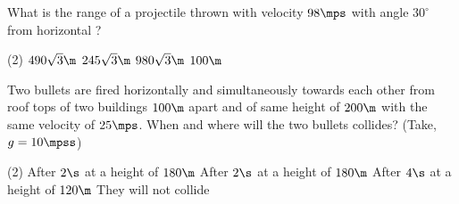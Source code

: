 \item What is the range of a projectile thrown with velocity $98\mps$ with angle $30^\circ$ from horizontal ?
\begin{tasks}(2)
    \task $490\sqrt{3}\m$\ans
    \task $245\sqrt{3}\m$
    \task $980\sqrt{3}\m$
    \task $100\m$
\end{tasks}

\item Two bullets are fired horizontally and simultaneously towards each other from roof tops of two buildings $100\m$ apart and of same height of $200\m$ with the same velocity of $25\mps$. When and where will the two bullets collides? (Take, $g=10\mpss$)
\begin{tasks}(2)
    \task After $2\s$ at a height of $180\m$\ans
    \task After $2\s$ at a height of $180\m$\ans
    \task After $4\s$ at a height of $120\m$
    \task They will not collide
\end{tasks}